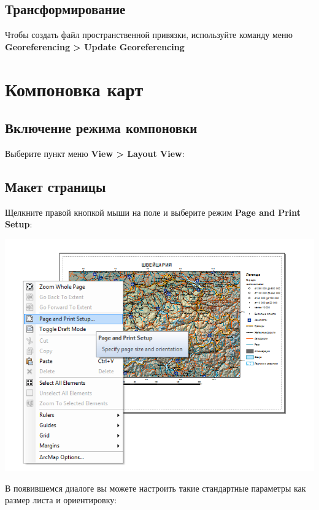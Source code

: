 \documentclass[]{book}
\theoremstyle{definition}
\theoremstyle{definition}
\theoremstyle{definition}
\theoremstyle{remark}
\begin{document}
\section{Трансформирование}

Чтобы создать файл пространственной привязки, используйте команду меню
\textbf{Georeferencing \textgreater{} Update Georeferencing}

\hypertarget{manual-layout}{%
\chapter{Компоновка карт}\label{manual-layout}}

\hypertarget{--}{%
\section{Включение режима компоновки}\label{--}}

Выберите пункт меню \textbf{View \textgreater{} Layout View}:

\hypertarget{-}{%
\section{Макет страницы}\label{-}}

Щелкните правой кнопкой мыши на поле и выберите режим \textbf{Page and
Print Setup}:

\includegraphics{images/Appendix/image51.png}

В появившемся диалоге вы можете настроить такие стандартные параметры
как размер листа и ориентировку:
\end{document}
